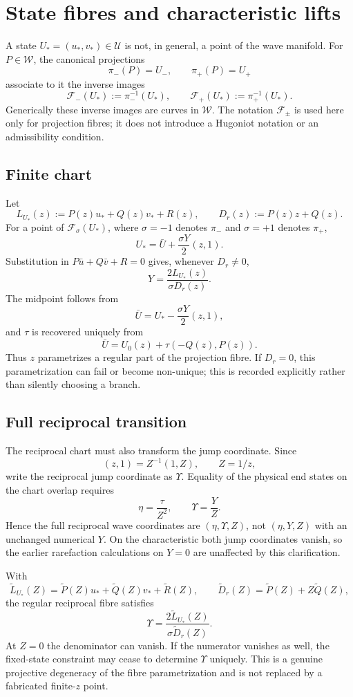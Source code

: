 \section{State fibres and characteristic lifts}

A state $U_*=(u_*,v_*)\in\mathcal U$ is not, in general, a point of the wave
manifold.  For $P\in\mathcal W$, the canonical projections
\[
 \pi_-(P)=U_-,\qquad \pi_+(P)=U_+
\]
associate to it the inverse images
\[
 \mathcal F_-(U_*):=\pi_-^{-1}(U_*),\qquad
 \mathcal F_+(U_*):=\pi_+^{-1}(U_*).
\]
Generically these inverse images are curves in $\mathcal W$.  The notation
$\mathcal F_\pm$ is used here only for projection fibres; it does not introduce
a Hugoniot notation or an admissibility condition.

\subsection{Finite chart}
Let
\[
 L_{U_*}(z):=P(z)u_*+Q(z)v_*+R(z),\qquad
 D_r(z):=P(z)z+Q(z).
\]
For a point of $\mathcal F_\sigma(U_*)$, where $\sigma=-1$ denotes $\pi_-$
and $\sigma=+1$ denotes $\pi_+$,
\[
 U_*=\bar U+\frac{\sigma Y}{2}(z,1).
\]
Substitution in $P\bar u+Q\bar v+R=0$ gives, whenever $D_r\ne0$,
\[
 \boxed{Y=\frac{2L_{U_*}(z)}{\sigma D_r(z)}}.
\]
The midpoint follows from
\[
 \bar U=U_*-\frac{\sigma Y}{2}(z,1),
\]
and $\tau$ is recovered uniquely from
\[
 \bar U=U_0(z)+\tau(-Q(z),P(z)).
\]
Thus $z$ parametrizes a regular part of the projection fibre.  If $D_r=0$,
this parametrization can fail or become non-unique; this is recorded explicitly
rather than silently choosing a branch.

\subsection{Full reciprocal transition}
The reciprocal chart must also transform the jump coordinate.  Since
\[
 (z,1)=Z^{-1}(1,Z),\qquad Z=1/z,
\]
write the reciprocal jump coordinate as $\Upsilon$.  Equality of the physical
end states on the chart overlap requires
\[
 \boxed{\eta=\frac{\tau}{Z^2}},\qquad
 \boxed{\Upsilon=\frac{Y}{Z}}.
\]
Hence the full reciprocal wave coordinates are $(\eta,\Upsilon,Z)$, not
$(\eta,Y,Z)$ with an unchanged numerical $Y$.  On the characteristic both
jump coordinates vanish, so the earlier rarefaction calculations on $Y=0$
are unaffected by this clarification.

With
\[
 \widetilde L_{U_*}(Z)=\widetilde P(Z)u_*+\widetilde Q(Z)v_*+\widetilde R(Z),
 \qquad
 \widetilde D_r(Z)=\widetilde P(Z)+Z\widetilde Q(Z),
\]
the regular reciprocal fibre satisfies
\[
 \boxed{\Upsilon=\frac{2\widetilde L_{U_*}(Z)}{\sigma\widetilde D_r(Z)}}.
\]
At $Z=0$ the denominator can vanish.  If the numerator vanishes as well, the
fixed-state constraint may cease to determine $\Upsilon$ uniquely.  This is a
genuine projective degeneracy of the fibre parametrization and is not replaced
by a fabricated finite-$z$ point.

